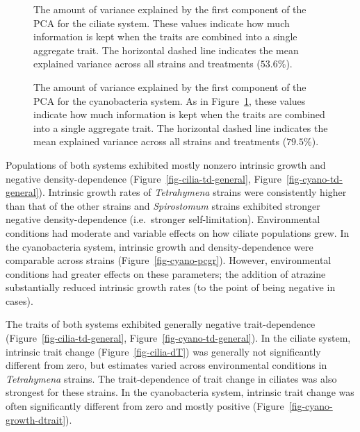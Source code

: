 \documentclass[
  letterpaper,
  DIV=11,
  numbers=noendperiod]{scrartcl}
\begin{document}
\begin{figure}


\caption{\label{fig-cilia-PC-var-explained}The amount of variance
explained by the first component of the PCA for the ciliate system.
These values indicate how much information is kept when the traits are
combined into a single aggregate trait. The horizontal dashed line
indicates the mean explained variance across all strains and treatments
(\(53.6\%\)).}

\end{figure}%

\begin{figure}


\caption{\label{fig-cyano-PC-var-explained}The amount of variance
explained by the first component of the PCA for the cyanobacteria
system. As in Figure~\ref{fig-cilia-PC-var-explained}, these values
indicate how much information is kept when the traits are combined into
a single aggregate trait. The horizontal dashed line indicates the mean
explained variance across all strains and treatments (\(79.5\%\)).}

\end{figure}%

Populations of both systems exhibited mostly nonzero intrinsic growth
and negative density-dependence (Figure~\ref{fig-cilia-td-general},
Figure~\ref{fig-cyano-td-general}). Intrinsic growth rates of
\emph{Tetrahymena} strains were consistently higher than that of the
other strains and \emph{Spirostomum} strains exhibited stronger negative
density-dependence (i.e.~stronger self-limitation). Environmental
conditions had moderate and variable effects on how ciliate populations
grew. In the cyanobacteria system, intrinsic growth and
density-dependence were comparable across strains
(Figure~\ref{fig-cyano-pcgr}). However, environmental conditions had
greater effects on these parameters; the addition of atrazine
substantially reduced intrinsic growth rates (to the point of being
negative in cases).

The traits of both systems exhibited generally negative trait-dependence
(Figure~\ref{fig-cilia-td-general}, Figure~\ref{fig-cyano-td-general}).
In the ciliate system, intrinsic trait change
(Figure~\ref{fig-cilia-dT}) was generally not significantly different
from zero, but estimates varied across environmental conditions in
\emph{Tetrahymena} strains. The trait-dependence of trait change in
ciliates was also strongest for these strains. In the cyanobacteria
system, intrinsic trait change was often significantly different from
zero and mostly positive (Figure~\ref{fig-cyano-growth-dtrait}).
\end{document}

